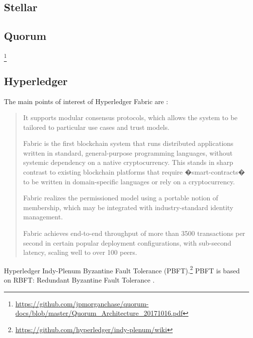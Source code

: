 \subsection{Stellar}


\subsection{Quorum}

\footnote{\url{https://github.com/jpmorganchase/quorum-docs/blob/master/Quorum_Architecture_20171016.pdf}}



\subsection{Hyperledger}
The main points of interest of Hyperledger Fabric are \cite{AndroulakiEtAl2018}:

\begin{quote}
\begin{packed_item1}
\item It supports modular consensus protocols, which allows the system to be tailored to particular use cases and trust models.
\item Fabric is the first blockchain system that runs distributed applications written in standard, general-purpose programming languages, without systemic dependency on a native cryptocurrency. This stands in sharp contrast to existing blockchain platforms that require �smart-contracts� to be written in domain-specific languages or rely on a cryptocurrency.
\item Fabric realizes the permissioned model using a portable notion of membership, which may be integrated with industry-standard identity management.
\item Fabric achieves end-to-end throughput of more than 3500 transactions per second in certain popular deployment configurations, with sub-second latency, scaling well to over 100 peers.
\end{packed_item1}
\end{quote}



Hyperledger Indy-Plenum Byzantine Fault Tolerance (PBFT).\footnote{\url{https://github.com/hyperledger/indy-plenum/wiki}} PBFT is based on RBFT: Redundant Byzantine Fault Tolerance
\cite{Aublinetal2013}.











